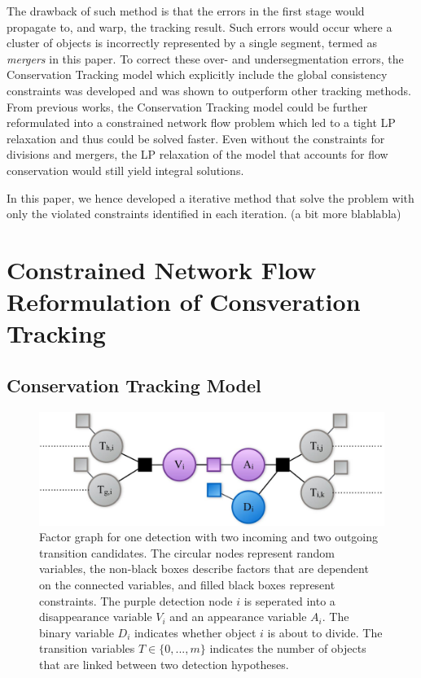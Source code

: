 \documentclass[10pt,twocolumn,letterpaper]{article}
\begin{document}
The drawback of such method is that the errors in the first stage would propagate to, and warp, the tracking result. Such errors would occur where a cluster of objects is incorrectly represented by a single segment, termed as \textit{mergers} in this paper. To correct these over- and undersegmentation errors, the Conservation Tracking model which explicitly include the global consistency constraints was developed and was shown to outperform other tracking methods. From previous works, the Conservation Tracking model could be further reformulated into a constrained network flow problem which led to a tight LP relaxation and thus could be solved faster. Even without the constraints for divisions and mergers, the LP relaxation of the model that accounts for flow conservation would still yield integral solutions.

In this paper, we hence developed a iterative method that solve the problem with only the violated constraints identified in each iteration. (a bit more blablabla)


\section{Constrained Network Flow Reformulation of Consveration Tracking}


\subsection{Conservation Tracking Model}

\begin{figure}[t]
\begin{center}
\centering\includegraphics[width=0.8\linewidth]{model.jpeg}
\end{center}
   \caption{Factor graph for one detection with two incoming and two outgoing transition candidates. The circular nodes represent random variables, the non-black boxes describe factors that are dependent on the connected variables, and filled black boxes represent constraints. The purple detection node $i$ is seperated into a disappearance variable $V_i$ and an appearance variable $A_i$. The binary variable $D_i$ indicates whether object $i$ is about to divide. The transition variables $T \in \{0,...,m\}$ indicates the number of objects that are linked between two detection hypotheses.}
\label{fig:ctmodel}
\end{figure}
\end{document}

